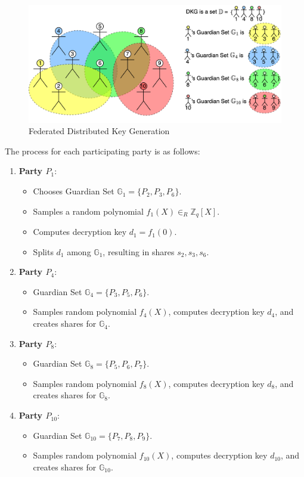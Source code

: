 \documentclass{article}
\begin{document}
\begin{figure}
    \centering
    \includegraphics[width=\textwidth]{FDKG.png}
    \caption{Federated Distributed Key Generation}
    \label{fig:FDKG}
\end{figure}

The process for each participating party is as follows:

\begin{enumerate}
    \item \textbf{Party $P_1$}:
    \begin{itemize}
        \item Chooses Guardian Set $\mathbb{G}_1 = \{P_2, P_3, P_6\}$.
        \item Samples a random polynomial $f_1(X) \in_R \mathbb{Z}_q[X]$.
        \item Computes decryption key $d_1 = f_1(0)$.
        \item Splits $d_1$ among $\mathbb{G}_1$, resulting in shares $s_2, s_3, s_6$.
    \end{itemize}

    \item \textbf{Party $P_4$}:
    \begin{itemize}
        \item Guardian Set $\mathbb{G}_4 = \{P_3, P_5, P_6\}$.
        \item Samples random polynomial $f_4(X)$, computes decryption key $d_4$, and creates shares for $\mathbb{G}_4$.
    \end{itemize}

    \item \textbf{Party $P_8$}:
    \begin{itemize}
        \item Guardian Set $\mathbb{G}_8 = \{P_5, P_6, P_7\}$.
        \item Samples random polynomial $f_8(X)$, computes decryption key $d_8$, and creates shares for $\mathbb{G}_8$.
    \end{itemize}

    \item \textbf{Party $P_{10}$}:
    \begin{itemize}
        \item Guardian Set $\mathbb{G}_{10} = \{P_7, P_8, P_9\}$.
        \item Samples random polynomial $f_{10}(X)$, computes decryption key $d_{10}$, and creates shares for $\mathbb{G}_{10}$.
    \end{itemize}
\end{enumerate}
\end{document}

